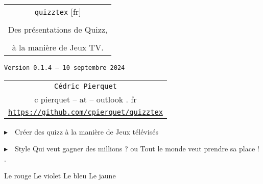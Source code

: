 \documentclass[french,a4paper,11pt]{article}
\def\TPversion{0.1.4}
\def\TPdate{10 septembre 2024}
\begin{document}
\setlength{\aweboxleftmargin}{0.07\linewidth}
\setlength{\aweboxcontentwidth}{0.93\linewidth}
\setlength{\aweboxvskip}{8pt}

\pagestyle{fancy}

\thispagestyle{empty}

\vspace{2cm}

\begin{center}
	\begin{minipage}{0.75\linewidth}
	\begin{tcolorbox}[colframe=yellow,colback=yellow!15]
		\begin{center}
			\begin{tabular}{c}
				{\Huge \texttt{quizztex} [fr]}\\
				\\
				{\LARGE Des présentations de Quizz,} \\
				\\
				{\LARGE à la manière de Jeux TV.} \\
			\end{tabular}
			
			\bigskip
			
			{\small \texttt{Version \TPversion{} -- \TPdate}}
		\end{center}
	\end{tcolorbox}
\end{minipage}
\end{center}

\begin{center}
	\begin{tabular}{c}
	\texttt{Cédric Pierquet}\\
	{\ttfamily c pierquet -- at -- outlook . fr}\\
	\texttt{\url{https://github.com/cpierquet/quizztex}}
\end{tabular}
\end{center}

\vspace{0.25cm}

{$\blacktriangleright$~~Créer des quizz à la manière de Jeux télévisés}

\vspace{0.25cm}

{$\blacktriangleright$~~Style \og Qui veut gagner des millions ? \fg{} ou \og Tout le monde veut prendre sa place ! \fg{}.}

\vspace{1cm}

\hfill{}
{Le rouge} {Le violet}
{Le bleu} {Le jaune}\hfill~
\end{document}
